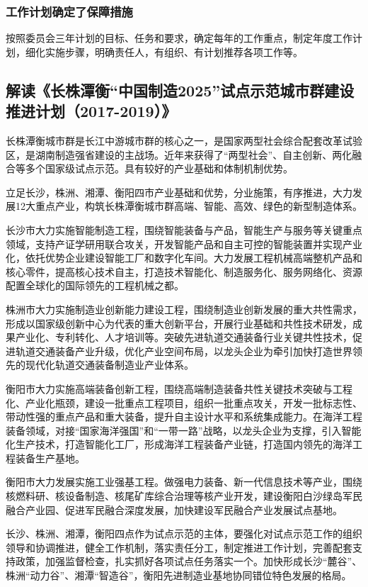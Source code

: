 \documentclass[UTF8,zihao=-4]{ctexart}
\begin{document}
\subsubsection{工作计划确定了保障措施}
按照委员会三年计划的目标、任务和要求，确定每年的工作重点，制定年度工作计划，细化实施步骤，明确责任人，有组织、有计划推荐各项工作等。

\subsection{解读《长株潭衡“中国制造2025”试点示范城市群建设推进计划（2017-2019）》}
长株潭衡城市群是长江中游城市群的核心之一，是国家两型社会综合配套改革试验区，是湖南制造强省建设的主战场。近年来获得了“两型社会”、自主创新、两化融合等多个国家级试点示范。具有较好的产业基础和体制机制优势。

立足长沙，株洲、湘潭、衡阳四市产业基础和优势，分业施策，有序推进，大力发展12大重点产业，构筑长株潭衡城市群高端、智能、高效、绿色的新型制造体系。

长沙市大力实施智能制造工程，围绕智能装备与产品，智能生产与服务等关键重点领域，支持产证学研用联合攻关，开发智能产品和自主可控的智能装置并实现产业化，依托优势企业建设智能工厂和数字化车间。大力发展工程机械高端整机产品和核心零件，提高核心技术自主，打造技术智能化、制造服务化、服务网络化、资源配置全球化的国际领先的工程机械之都。

株洲市大力实施制造业创新能力建设工程，围绕制造业创新发展的重大共性需求，形成以国家级创新中心为代表的重大创新平台，开展行业基础和共性技术研发，成果产业化、专利转化、人才培训等。突破先进轨道交通装备行业关键共性技术，促进轨道交通装备产业升级，优化产业空间布局，以龙头企业为牵引加快打造世界领先的现代化轨道交通装备制造业产业体系。

衡阳市大力实施高端装备创新工程，围绕高端制造装备共性关键技术突破与工程化、产业化瓶颈，建设一批重点工程项目，组织一批重点攻关，开发一批标志性、带动性强的重点产品和重大装备，提升自主设计水平和系统集成能力。在海洋工程装备领域，对接“国家海洋强国”和“一带一路”战略，以龙头企业为支撑，引入智能化生产技术，打造智能化工厂，形成海洋工程装备产业链，打造国内领先的海洋工程装备生产基地。

衡阳市大力发展实施工业强基工程。做强电力装备、新一代信息技术等产业，围绕核燃料研、核设备制造、核尾矿库综合治理等核产业开发，建设衡阳白沙绿岛军民融合产业园、促进军民融合深度发展，加快建设军民融合产业发展试点基地。

长沙、株洲、湘潭，衡阳四点作为试点示范的主体，要强化对试点示范工作的组织领导和协调推进，健全工作机制，落实责任分工，制定推进工作计划，完善配套支持政策，加强监督检查，扎实抓好各项试点任务落实一个。加快形成长沙“麓谷”、株洲“动力谷”、湘潭“智造谷”，衡阳先进制造业基地协同错位特色发展的格局。
\end{document}
